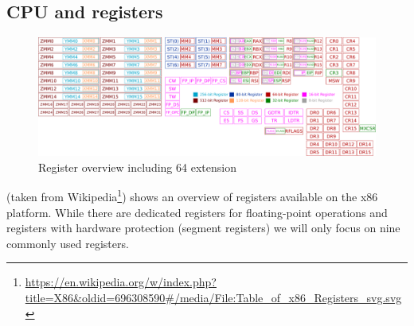 \documentclass[article]{uibk}
\begin{document}
\subsection{CPU and registers}

\begin{figure}[htpb]
    \centering
    \includegraphics[width=\textwidth]{gfx/x86_registers.pdf}
    \caption{Register overview including \SI{64}{\bit} extension}
    \label{fig:registers}
\end{figure}

 (taken from
Wikipedia\footnote{\url{https://en.wikipedia.org/w/index.php?title=X86&oldid=696308590\#/media/File:Table_of_x86_Registers_svg.svg}})
shows an overview of registers available on the x86 platform. While there are
dedicated registers for floating-point operations and registers with hardware
protection (segment registers) we will only focus on nine commonly used
registers.
\end{document}
